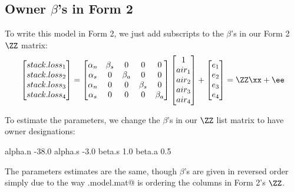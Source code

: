 \subsection{Owner $\beta$'s in Form 2}
To write this model in Form 2, we just add subscripts to the $\beta$'s in our Form 2 $\ZZ$ matrix:
\begin{equation}\label{eqn:stackloss.form2.owners}
\begin{bmatrix}stack.loss_1\\ stack.loss_2\\ stack.loss_3\\ stack.loss_4\end{bmatrix}
= 
\begin{bmatrix}
\alpha_n&\beta_s&0&0&0\\
\alpha_s&0&\beta_a&0&0\\
\alpha_n&0&0&\beta_s&0\\
\alpha_s&0&0&0&\beta_a
\end{bmatrix}\begin{bmatrix}1\\air_1\\air_2\\air_3\\air_4\end{bmatrix}
+
\begin{bmatrix}e_1\\e_2\\e_3\\e_4\end{bmatrix}=\ZZ\xx+\ee
\end{equation}

To estimate the parameters, we change the $\beta$'s in our $\ZZ$ list matrix to have owner designations:
\begin{Schunk}
\begin{Soutput}
         [,1]
alpha.n -38.0
alpha.s  -3.0
beta.s    1.0
beta.a    0.5
\end{Soutput}
\end{Schunk}
The parameters estimates are the same, though $\beta$'s are given in reversed order simply due to the way \verb@convert.model.mat@ is ordering the columns in Form 2's $\ZZ$.

